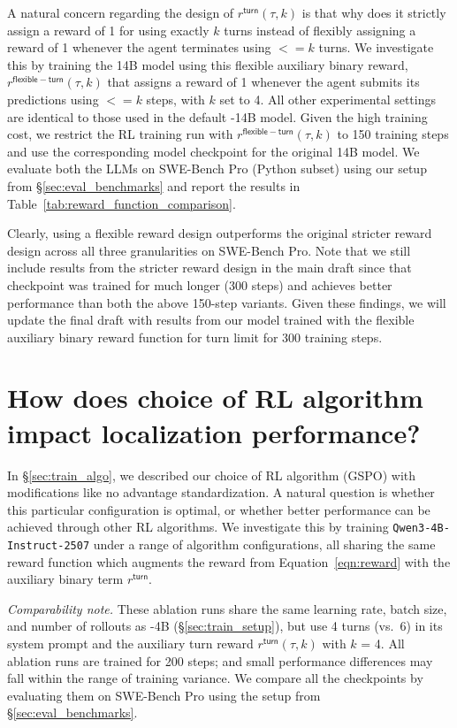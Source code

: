 A natural concern regarding the design of $r^{\mathsf{turn}}(\tau, k)$ is that why does it strictly assign a reward of 1 for using exactly $k$ turns instead of flexibly assigning a reward of 1 whenever the agent terminates using $<=k$ turns. We investigate this by training the 14B model using this flexible auxiliary binary reward,  $r^{\mathsf{flexible-turn}}(\tau, k)$ that assigns a reward of 1 whenever the agent submits its predictions using $<=k$ steps, with $k$ set to 4. All other experimental settings are identical to those used in the default \methodname-14B model. Given the high training cost, we restrict the RL training run with $r^{\mathsf{flexible-turn}}(\tau, k)$ to 150 training steps and use the corresponding model checkpoint for the original 14B model. We evaluate both the LLMs on SWE-Bench Pro (Python subset) using our setup from \S\ref{sec:eval_benchmarks} and report the results in Table~\ref{tab:reward_function_comparison}.

Clearly, using a flexible reward design outperforms the original stricter reward design across all three granularities on SWE-Bench Pro. Note that we still include results from the stricter reward design in the main draft since that checkpoint was trained for much longer (300 steps) and achieves better performance than both the above 150-step variants. Given these findings, we will update the final draft with results from our model trained with the flexible auxiliary binary reward function for turn limit for 300 training steps. 


\section{How does choice of RL algorithm impact localization performance?}\label{appendix:rl_ablation_study}



In \S\ref{sec:train_algo}, we described our choice of RL algorithm (GSPO) with modifications like no advantage standardization. A natural question is whether this particular configuration is optimal, or whether better performance can be achieved through other RL algorithms. We investigate this by training \texttt{Qwen3-4B-Instruct-2507} under a range of algorithm configurations, all sharing the same reward function which augments the reward from Equation~\ref{eqn:reward} with the auxiliary binary term $r^{\mathsf{turn}}$.

\emph{Comparability note.} These ablation runs share the same learning rate, batch size, and number of rollouts as \methodname-4B (\S\ref{sec:train_setup}), but use 4 turns (vs.\ 6) in its system prompt and the auxiliary turn reward $r^{\mathsf{turn}}(\tau, k)$ with $k$ = 4. All ablation runs are trained for 200 steps; and small performance differences may fall within the range of training variance. We compare all the checkpoints by evaluating them on SWE-Bench Pro using the setup from \S\ref{sec:eval_benchmarks}.

